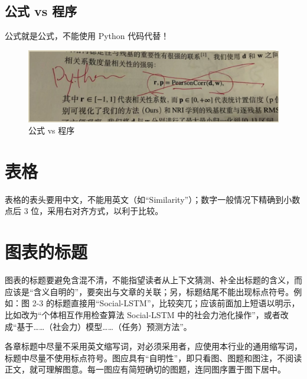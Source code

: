 \subsection{公式 vs 程序}
公式就是公式，不能使用 Python 代码代替！

\begin{figure}[!htpb]
\centering
\includegraphics[scale=0.65]{doc/figures/chk08.jpg}
\caption{公式 vs 程序}
\label{fig:eqvscode}
\end{figure}


\section{表格}
表格的表头要用中文，不能用英文（如“Similarity”）；数字一般情况下精确到小数点后 3 位，采用右对齐方式，以利于比较。

\section{图表的标题}
图表的标题要避免含混不清，不能指望读者从上下文猜测、补全出标题的含义，而应该是“含义自明的”，要突出与文章的关联；另，标题结尾不能出现标点符号。例如：图 2-3 的标题直接用“Social-LSTM”，比较突兀；应该前面加上短语以明示，比如改为“个体相互作用检查算法 Social-LSTM 中的社会力池化操作”，或者改成“基于……（社会力）模型……（任务）预测方法”。

各章标题中尽量不采用英文缩写词，对必须采用者，应使用本行业的通用缩写词，标题中尽量不使用标点符号。图应具有“自明性”，即只看图、图题和图注，不阅读正文，就可理解图意。每一图应有简短确切的图题，连同图序置于图下居中。

